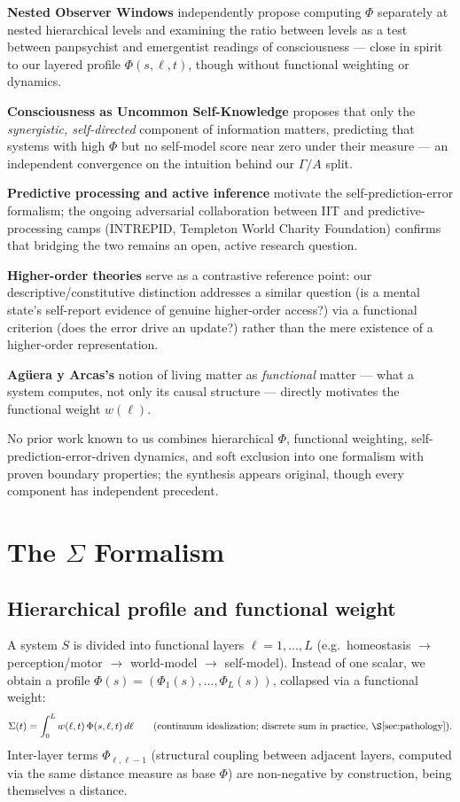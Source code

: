\documentclass[11pt]{article}
\begin{document}
\textbf{Nested Observer Windows} \cite{fink2024} independently propose computing $\Phi$ separately at nested hierarchical levels and examining the ratio between levels as a test between panpsychist and emergentist readings of consciousness --- close in spirit to our layered profile $\Phi(s,\ell,t)$, though without functional weighting or dynamics.

\textbf{Consciousness as Uncommon Self-Knowledge} \cite{usk2026} proposes that only the \emph{synergistic, self-directed} component of information matters, predicting that systems with high $\Phi$ but no self-model score near zero under their measure --- an independent convergence on the intuition behind our $\Gamma/A$ split.

\textbf{Predictive processing and active inference} \cite{friston2010,deane2021} motivate the self-prediction-error formalism; the ongoing adversarial collaboration between IIT and predictive-processing camps (INTREPID, Templeton World Charity Foundation) confirms that bridging the two remains an open, active research question.

\textbf{Higher-order theories} \cite{rosenthal2005} serve as a contrastive reference point: our descriptive/constitutive distinction addresses a similar question (is a mental state's self-report evidence of genuine higher-order access?) via a functional criterion (does the error drive an update?) rather than the mere existence of a higher-order representation.

\textbf{Ag\"uera y Arcas's} notion of living matter as \emph{functional} matter --- what a system computes, not only its causal structure --- directly motivates the functional weight $w(\ell)$.

No prior work known to us combines hierarchical $\Phi$, functional weighting, self-prediction-error-driven dynamics, and soft exclusion into one formalism with proven boundary properties; the synthesis appears original, though every component has independent precedent.

\section{The $\Sigma$ Formalism}

\subsection{Hierarchical profile and functional weight}
A system $S$ is divided into functional layers $\ell=1,\dots,L$ (e.g.\ homeostasis $\to$ perception/motor $\to$ world-model $\to$ self-model). Instead of one scalar, we obtain a profile $\Phi(s)=(\Phi_1(s),\dots,\Phi_L(s))$, collapsed via a functional weight:
\[
\Sigma(t) = \int_0^L w(\ell,t)\,\Phi(s,\ell,t)\,d\ell \qquad \text{(continuum idealization; discrete sum in practice, \S\ref{sec:pathology})}.
\]
Inter-layer terms $\Phi_{\ell,\ell-1}$ (structural coupling between adjacent layers, computed via the same distance measure as base $\Phi$) are non-negative by construction, being themselves a distance.
\end{document}
